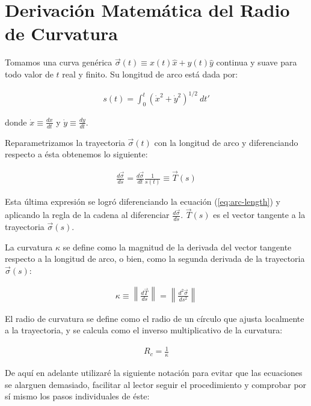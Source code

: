 \appendix
\newcommand{\norm}[1]{\left\lVert#1\right\rVert}
\section{Derivación Matemática del Radio de Curvatura}
\label{app:math-curvature radius}

Tomamos una curva genérica $\vec{\sigma}(t) \equiv x(t) \hat{x} + y(t) \hat{y}$ continua y suave para todo valor de $t$ real y finito.
Su longitud de arco está dada por:

\begin{align}
  s(t) = \int^t_0 \left(\dot{x}^2 + \dot{y}^2\right)^{1/2}~dt' \label{eq:arc-length}
\end{align}

donde $\dot{x} \equiv \frac{dx}{dt}$ y $\dot{y} \equiv\frac{dy}{dt}$.

Reparametrizamos la trayectoria $\vec{\sigma}(t)$ con la longitud de arco y diferenciando respecto a ésta obtenemos lo siguiente:

\begin{align}
  \frac{d\vec{\sigma}}{ds} = \frac{d\vec{\sigma}}{dt}\frac{1}{s(t)} \equiv \vec{T}(s)
\end{align}

Esta última expresión se logró diferenciando la ecuación (\ref{eq:arc-length}) y aplicando la regla de la cadena al diferenciar
$\frac{d\vec{\sigma}}{ds}$. $\vec{T}(s)$ es el vector tangente a la trayectoria $\vec{\sigma}(s)$.

La curvatura $\kappa$ se define como la magnitud de la derivada del vector tangente respecto a la longitud de arco, o bien, como la
segunda derivada de la trayectoria $\vec{\sigma}(s)$:

\begin{align}
  \kappa \equiv \norm{\frac{d\vec{T}}{ds}} = \norm{\frac{d^2\vec{\sigma}}{ds^2}} 
\end{align}

El radio de curvatura se define como el radio de un círculo que ajusta localmente a la trayectoria, y se calcula como el inverso
multiplicativo de la curvatura:

\begin{align}
  R_c = \frac{1}{\kappa}
\end{align}

De aquí en adelante utilizaré la siguiente notación para evitar que las ecuaciones se alarguen demasiado, facilitar al lector seguir
el procedimiento y comprobar por sí mismo los pasos individuales de éste:

